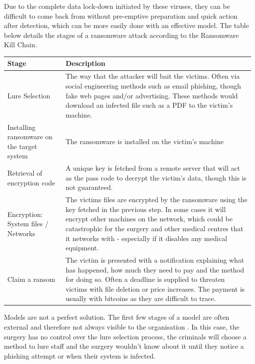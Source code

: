 \documentclass[12pt,a4paper]{article}
\begin{document}
Due to the complete data lock-down initiated by these viruses, they can be difficult to come back from without pre-emptive preparation and quick action after detection, which can be more easily done with an effective model. The table below details the stages of a ransomware attack according to the Ransomware Kill Chain.

\begin{center}
\begin{longtable}{ |p{}|p{}| } 
 \hline
 \textbf{Stage} & \textbf{Description} \\ 
  \hline
 Lure Selection & The way that the attacker will bait the victims. Often via social engineering methods such as email phishing, though fake web pages and/or advertising. These methods would download an infected file such as a PDF to the victim's machine.\\ 
  \hline
 Installing ransomware on the target system & The ransomware is installed on the victim's machine \\ 
 \hline
 Retrieval of encryption code & A unique key is fetched from a remote server that will act as the pass code to decrypt the victim's data, though this is not guaranteed. \\ 
 \hline
 Encryption: System files / Networks & The victims files are encrypted by the ransomware using the key fetched in the previous step. In some cases it will encrypt other machines on the network, which could be catastrophic for the surgery and other medical centres that it networks with - especially if it disables any medical equipment. \\ 
 \hline
 Claim a ransom & The victim is presented with a notification explaining what has happened, how much they need to pay and the method for doing so. Often a deadline is supplied to threaten victims with file deletion or price increases. The payment is usually with bitcoins as they are difficult to trace. \\ 
 \hline
\end{longtable}
\caption{\textit{Table 3: The Ransomware Kill Chain}}
\end{center}

Models are not a perfect solution. The first few stages of a model are often external and therefore not always visible to the organisation \cite{AttackCKC}. In this case, the surgery has no control over the lure selection process, the criminals will choose a method to lure staff and the surgery wouldn't know about it until they notice a phishing attempt or when their system is infected.
\end{document}
